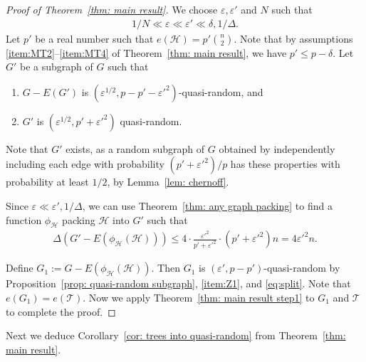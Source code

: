 \documentclass[a4paper, 11pt, reqno]{amsart}
\numberwithin{equation}{section}
\newcommand{\1}{{\rm 1\hspace*{-0.4ex}%
\rule{0.1ex}{1.52ex}\hspace*{0.2ex}}}
\newcommand{\cT}{\mathcal{T}}
\newcommand{\cH}{\mathcal{H}}
\renewcommand{\epsilon}{\varepsilon}
\newcommand{\COMMENT}[1]{}
\newcounter{step}
\begin{document}
\begin{proof}[Proof of Theorem~\ref{thm: main result}]
We choose $\epsilon, \epsilon'$ and $N$ such that
\begin{align*}
	1/N\ll \epsilon \ll \epsilon'\ll \delta,1/\Delta.
\end{align*}
Let $p'$ be a real number such that $e(\cH)= p'\binom{n}{2}$.
Note that by assumptions \ref{item:MT2}--\ref{item:MT4} of Theorem~\ref{thm: main result},
we have $p'\leq p -\delta$.
Let $G'$ be a subgraph of $G$ such that 
\begin{enumerate}[label=(Z\arabic*)]
\item\label{item:Z1} $G - E(G')$ is $(\epsilon^{1/2},p-p'-\epsilon'^2)$-quasi-random, and
\item\label{item:Z2} $G'$ is $(\epsilon^{1/2}, p'+\epsilon'^2)$ quasi-random.
\end{enumerate}
Note that $G'$ exists, as a random subgraph of $G$ obtained by independently including each edge with probability $(p'+\epsilon'^2)/p$ has these properties with probability at least $1/2$, by Lemma~\ref{lem: chernoff}.

Since $\epsilon \ll \epsilon',1/\Delta$,
we can use Theorem~\ref{thm: any graph packing} to find a function $\phi_{\cH}$ packing $\cH$ into $G'$ such that 
\begin{align}\label{eq:split}
	\Delta(G' - E(\phi_{\cH}(\cH)))\leq 4 \cdot \frac{\epsilon'^2}{p'+\epsilon'^2} \cdot (p'+\epsilon'^2) n = 4\epsilon'^2 n.
\end{align}
\COMMENT{Note that $G'$ is $(\epsilon^{1/2},p'+\epsilon'^2)$ quasi-random and $e(\cH)= p'\binom{n}{2} = (1- \epsilon'^2/(p'+\epsilon'^2))(p'+\epsilon'^2)\binom{n}{2}$. 
Thus   $\epsilon'^2/(p'+\epsilon'^2)$ is playing the role of $\alpha$ and 
$p'+\epsilon'^2$ is playing the role of $p$. 
Thus we get 
$4 (\epsilon'^2/(p'+\epsilon'^2)) (p'+\epsilon'^2) n=4\epsilon'^2 n$.}
Define $G_1:= G-E(\phi_{\cH}(\cH))$.
Then
$G_1$ is $(\epsilon',p-p')$-quasi-random  by Proposition~\ref{prop: quasi-random subgraph}, \ref{item:Z1}, 
and \eqref{eq:split}.
Note that $e(G_1)=e(\cT)$.
Now we apply Theorem~\ref{thm: main result step1} to $G_1$ and $\cT$ to complete the proof.
\end{proof}

Next we deduce Corollary~\ref{cor: trees into quasi-random} from Theorem~\ref{thm: main result}.
\end{document}
